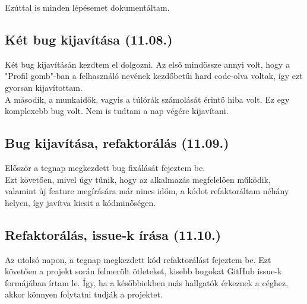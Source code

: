 \documentclass[a4paper]{article}
\begin{document}
Ezúttal is minden lépésemet dokumentáltam.

\subsection{Két bug kijavítása (11.08.)}

Két bug kijavításán kezdtem el dolgozni. Az első mindössze annyi volt, hogy a "Profil gomb"-ban a
felhasználó nevének kezdőbetűi hard code-olva voltak, így ezt gyorsan kijavítottam.\\

A második, a munkaidők, vagyis a túlórák számolását érintő hiba volt. Ez egy komplexebb bug volt.
Nem is tudtam a nap végére kijavítani.

\subsection{Bug kijavítása, refaktorálás (11.09.)}

Először a tegnap megkezdett bug fixálását fejeztem be.\\

Ezt követően, mivel úgy tűnik, hogy az alkalmazás megfelelően működik, valamint új feature
megírására már nincs időm, a kódot refaktoráltam néhány helyen, így javítva kicsit a kódminőségen.

\subsection{Refaktorálás, issue-k írása (11.10.)}

Az utolsó napon, a tegnap megkezdett kód refaktorálást fejeztem be. Ezt követően a projekt során
felmerült ötleteket, kisebb bugokat GitHub issue-k formájában írtam le. Így, ha a későbbiekben más
hallgatók érkeznek a céghez, akkor könnyen folytatni tudják a projektet.
\end{document}
